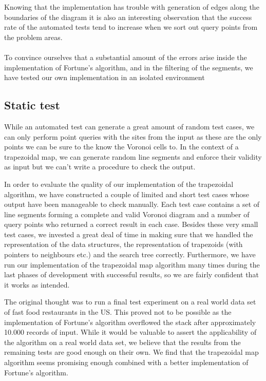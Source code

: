 Knowing that the implementation has trouble with generation of edges along the boundaries of the diagram it is also an interesting observation that the success rate of the automated tests tend to increase when we sort out query points from the problem areas.\paragraph{}

To convince ourselves that a substantial amount of the errors arise inside the implementation of Fortune’s algorithm, and in the filtering of the segments, we have tested our own implementation in an isolated environment 

\subsection{Static test}
While an automated test can generate a great amount of random test cases, we can only perform point queries with the sites from the input as these are the only points we can be sure to the know the Voronoi cells to. In the context of a trapezoidal map, we can generate random line segments and enforce their validity as input but we can’t write a procedure to check the output.

In order to evaluate the quality of our implementation of the trapezoidal algorithm, we have constructed a couple of limited and short test cases whose output have been manageable to check manually. Each test case contains a set of line segments forming a complete and valid Voronoi diagram and a number of query points who returned a correct result in each case. Besides these very small test cases, we invested a great deal of time in making sure that we handled the representation of the data structures, the representation of trapezoids (with pointers to neighbours etc.) and the search tree correctly.
Furthermore, we have run our implementation of the trapezoidal map algorithm many times during the last phases of development with successful results, so we are fairly confident that it works as intended.

The original thought was to run a final test experiment on a real world data set of fast food restaurants in the US. This proved not to be possible as the implementation of Fortune’s algorithm overflowed the stack after approximately 10.000 records of input. While it would be valuable to assert the applicability of the algorithm on a real world data set, we believe that the results from the remaining tests are good enough on their own. We find that the trapezoidal map algorithm seems promising enough combined with a better implementation of Fortune’s algorithm. 



